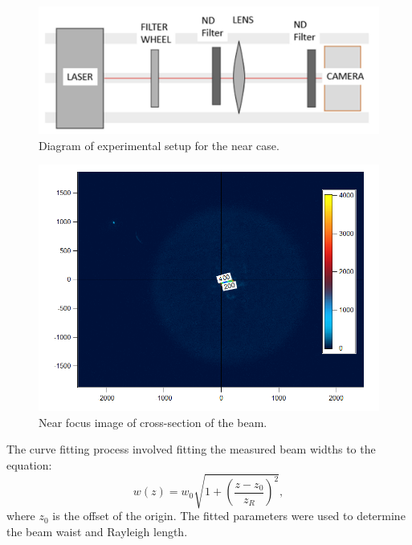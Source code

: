 \documentclass[12pt]{article}
\begin{document}
\begin{figure}[H]
    \centering
    \includegraphics[width=1\linewidth]{Near_Diagram.png}
    \caption{Diagram of experimental setup for the near case.}
    \label{fig:near-setup}
\end{figure}

\begin{figure}[H]
    \centering
    \includegraphics[width=1\linewidth]{Near_Focus.png}
    \caption{Near focus image of cross-section of the beam.}
    \label{fig:near-focus}
\end{figure}

The curve fitting process involved fitting the measured beam widths to the equation:
\[
w(z) = w_0 \sqrt{1 + \left(\frac{z - z_0}{z_R}\right)^2},
\]
where \(z_0\) is the offset of the origin. The fitted parameters were used to determine the beam waist and Rayleigh length.
\end{document}
